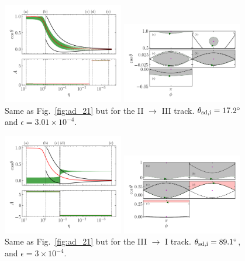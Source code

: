 \documentclass[twocolumn,twocolappendix]{aastex63}
\begin{document}
\begin{figure}
    \centering
    \includegraphics[width=0.47\textwidth]{plots_diskdisp/3testo23.png}

    \includegraphics[width=0.47\textwidth]{plots_diskdisp/3testo23_subplots.png}
    \caption{Same as Fig.~\ref{fig:ad_21} but for the II $\to$ III track.
    $\theta_{\rm sd, i} = 17.2^\circ$ and $\epsilon = 3.01 \times
    10^{-4}$.}\label{fig:ad_23}
\end{figure}
\begin{figure}
    \centering
    \includegraphics[width=0.47\textwidth]{plots_diskdisp/3testo31.png}

    \includegraphics[width=0.47\textwidth]{plots_diskdisp/3testo31_subplots.png}
    \caption{Same as Fig.~\ref{fig:ad_21} but for the III $\to$ I track.
    $\theta_{\rm sd, i} = 89.1^\circ$, and $\epsilon = 3 \times
    10^{-4}$.}\label{fig:ad_31}
\end{figure}
\end{document}
